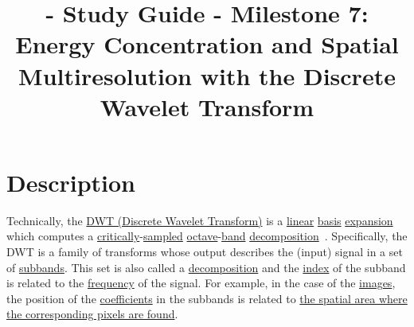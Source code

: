 
\title{\SM{} - Study Guide - Milestone 7: Energy Concentration and Spatial Multiresolution with the Discrete Wavelet Transform}

\maketitle

\tableofcontents

\section{Description}

Technically, the
\href{https://en.wikipedia.org/wiki/Discrete_wavelet_transform}{DWT
  (Discrete Wavelet Transform)} is a
\href{https://en.wikipedia.org/wiki/Linearity}{linear}
\href{https://en.wikipedia.org/wiki/Change_of_basis}{basis}
\href{https://www.youtube.com/watch?v=P2LTAUO1TdA}{expansion} which
computes a
\href{https://www.dsprelated.com/freebooks/sasp/Critically_Sampled_Perfect_Reconstruction.html}{critically}-\href{https://en.wikipedia.org/wiki/Nyquist-Shannon_sampling_theorem}{sampled}
\href{https://en.wikipedia.org/wiki/Octave_(electronics)}{octave}-\href{https://en.wikipedia.org/wiki/Frequency_band}{band}
\href{https://www.sciencedirect.com/topics/engineering/wavelet-decomposition}{decomposition}~\cite{vetterli2014foundations,kovacevic2013fourier}. Specifically,
the DWT is a family of transforms whose output describes the (input)
signal in a set of
\href{https://en.wikipedia.org/wiki/Sub-band_coding}{subbands}. This
set is also called
a \href{https://en.wikipedia.org/wiki/Discrete_wavelet_transform}{decomposition}
and the
\href{https://en.wikipedia.org/wiki/Array_data_structure#Element_identifier_and_addressing_formulas}{index}
of the subband is related to the
\href{https://en.wikipedia.org/wiki/Frequency}{frequency} of the
signal. For example, in the case of the
\href{https://en.wikipedia.org/wiki/Digital_image}{images}, the
position of the
\href{https://en.wikipedia.org/wiki/Coefficient}{coefficients} in the
subbands is related to
\href{https://en.wikipedia.org/wiki/Discrete_wavelet_transform#/media/File:Jpeg2000_2-level_wavelet_transform-lichtenstein.png}{the
  spatial area where the corresponding pixels are found}.


